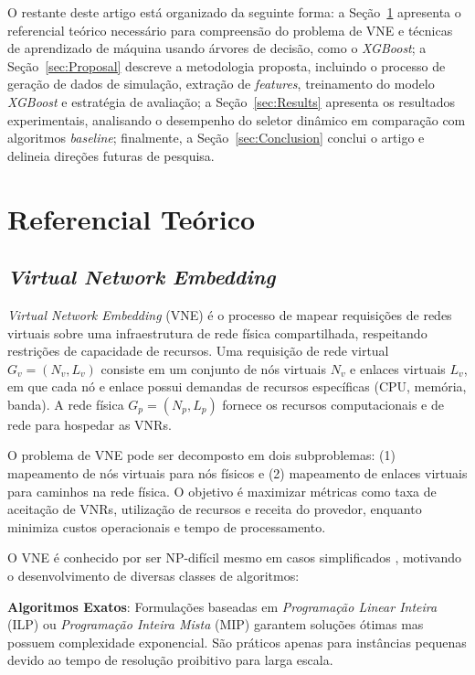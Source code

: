 \documentclass[conference]{IEEEtran}
\begin{document}
O restante deste artigo está organizado da seguinte forma: a Seção~\ref{sec:RefTeo} apresenta o referencial teórico necessário para compreensão do problema de VNE e técnicas de aprendizado de máquina usando árvores de decisão, como o \textit{XGBoost}; a Seção~\ref{sec:Proposal} descreve a metodologia proposta, incluindo o processo de geração de dados de simulação, extração de \textit{features}, treinamento do modelo \textit{XGBoost} e estratégia de avaliação; a Seção~\ref{sec:Results} apresenta os resultados experimentais, analisando o desempenho do seletor dinâmico em comparação com algoritmos \textit{baseline}; finalmente, a Seção~\ref{sec:Conclusion} conclui o artigo e delineia direções futuras de pesquisa.

\section{Referencial Teórico}
\label{sec:RefTeo}

\subsection{\textit{Virtual Network Embedding}}

\textit{Virtual Network Embedding} (VNE) é o processo de mapear requisições de redes virtuais sobre uma infraestrutura de rede física compartilhada, respeitando restrições de capacidade de recursos. Uma requisição de rede virtual $G_v = (N_v, L_v)$ consiste em um conjunto de nós virtuais $N_v$ e enlaces virtuais $L_v$, em que cada nó e enlace possui demandas de recursos específicas (CPU, memória, banda). A rede física $G_p = (N_p, L_p)$ fornece os recursos computacionais e de rede para hospedar as VNRs.

O problema de VNE pode ser decomposto em dois subproblemas: (1) mapeamento de nós virtuais para nós físicos e (2) mapeamento de enlaces virtuais para caminhos na rede física. O objetivo é maximizar métricas como taxa de aceitação de VNRs, utilização de recursos e receita do provedor, enquanto minimiza custos operacionais e tempo de processamento.

O VNE é conhecido por ser NP-difícil mesmo em casos simplificados \cite{vnboost}, motivando o desenvolvimento de diversas classes de algoritmos:

\textbf{Algoritmos Exatos}: Formulações baseadas em \textit{Programação Linear Inteira} (ILP) ou \textit{Programação Inteira Mista} (MIP) garantem soluções ótimas mas possuem complexidade exponencial. São práticos apenas para instâncias pequenas devido ao tempo de resolução proibitivo para larga escala.
\end{document}
